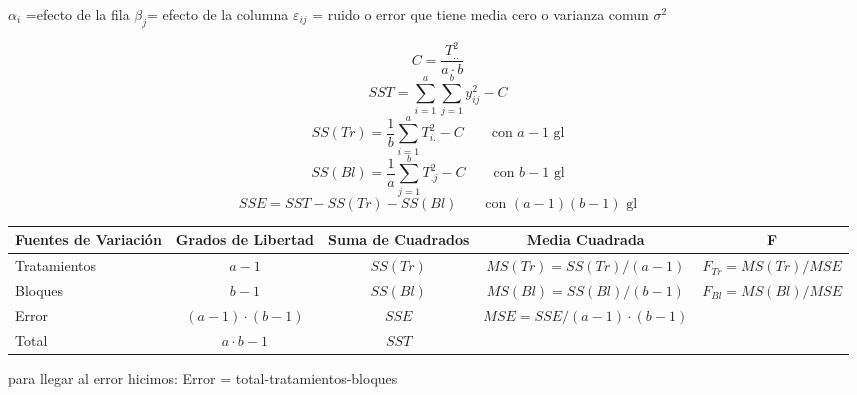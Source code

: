 \documentclass[10pt,a4paper]{article}
\begin{document}
\hfill {\small $\alpha_i$ =efecto de la fila \quad $\beta_j$= efecto de la columna \quad $\varepsilon_{ij}$ = ruido o error que tiene media cero o varianza comun $\sigma^2$}

\[
C = \frac{T_{..}^2}{a\cdot b}
\]
\[
SST = \sum_{i=1}^{a}\sum_{j=1}^{b} y_{ij}^2 - C
\]
\[
SS(Tr) = \frac{1}{b}\sum_{i=1}^{a} T_{i.}^2 - C \qquad \text{con } a-1 \text{ gl}
\]
\[
SS(Bl) = \frac{1}{a}\sum_{j=1}^{b} T_{.j}^2 - C \qquad \text{con } b-1 \text{ gl}
\]
\[
SSE = SST - SS(Tr) - SS(Bl) \qquad \text{con } (a-1)(b-1) \text{ gl}
\]

\begin{center}
\vspace{-2pt}
{\footnotesize
\begin{tabular}{l c c c c}
\toprule
\textbf{Fuentes de Variación} & \textbf{Grados de Libertad} & \textbf{Suma de Cuadrados} & \textbf{Media Cuadrada} & \textbf{F} \\
\midrule
Tratamientos & $a-1$ & $SS(Tr)$ & $MS(Tr)=SS(Tr)/(a-1)$ & $F_{Tr}=MS(Tr)/MSE$ \\
Bloques & $b-1$ & $SS(Bl)$ & $MS(Bl)=SS(Bl)/(b-1)$ & $F_{Bl}=MS(Bl)/MSE$ \\
Error & $(a-1)\cdot(b-1)$ & $SSE$ & $MSE=SSE/(a-1)\cdot(b-1)$ & \\
Total & $a\cdot b-1$ & $SST$ & & \\
\bottomrule
\end{tabular}
}
\end{center}

para llegar al error hicimos: \quad Error = total-tratamientos-bloques
\end{document}

